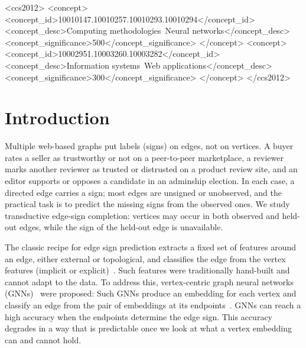 \documentclass[sigconf, review, anonymous]{acmart}
\theoremstyle{plain}
\theoremstyle{definition}
\begin{document}
\begin{CCSXML}
<ccs2012>
   <concept>
       <concept_id>10010147.10010257.10010293.10010294</concept_id>
       <concept_desc>Computing methodologies~Neural networks</concept_desc>
       <concept_significance>500</concept_significance>
       </concept>
   <concept>
       <concept_id>10002951.10003260.10003282</concept_id>
       <concept_desc>Information systems~Web applications</concept_desc>
       <concept_significance>300</concept_significance>
       </concept>
 </ccs2012>
\end{CCSXML}



\maketitle

\section{Introduction}

Multiple web-based graphs put labels (signs) on edges, not on vertices. A buyer rates a seller as trustworthy or not on a peer-to-peer marketplace, a reviewer marks another reviewer as trusted or distrusted on a product review site, and an editor supports or opposes a candidate in an adminship election. In each case, a directed edge carries a sign; most edges are unsigned or unobserved, and the practical task is to predict the missing signs from the observed ones. We study transductive edge-sign completion: vertices may occur in both observed and held-out edges, while the sign of the held-out edge is unavailable.

The classic recipe for edge sign prediction extracts a fixed set of features around an edge, either external or topological, and classifies the edge from the vertex features (implicit or explicit)~\citep{leskovec2010predicting}. Such features were traditionally hand-built and cannot adapt to the data. To address this, vertex-centric graph neural networks (GNNs)~\citep{kipf2017semi, gilmer2017neural} were proposed: Such GNNs produce an embedding for each vertex and classify an edge from the pair of embeddings at its endpoints~\citep{derr2018signed, huang2019signed}. GNNs can reach a high accuracy when the endpoints determine the edge sign. This accuracy degrades in a way that is predictable once we look at what a vertex embedding can and cannot hold.
\end{document}
